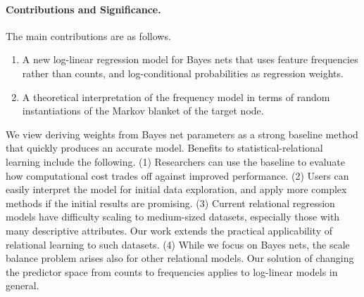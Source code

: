 \documentclass{article}
\begin{document}



\paragraph{Contributions and Significance.} The main contributions are as follows.
\begin{enumerate}
\item A new log-linear regression model for Bayes nets that uses feature frequencies rather than counts, and log-conditional probabilities as regression weights.
\item A theoretical interpretation of the frequency model in terms of random instantiations of the Markov blanket of the target node.
\end{enumerate}

We view deriving weights from Bayes net parameters as a strong baseline method that quickly produces an accurate model.  Benefits to statistical-relational learning include the following. (1) Researchers can use the baseline to evaluate how computational cost trades off against improved performance. (2) Users can easily interpret the model for initial data exploration, and apply more complex methods if the initial results are promising. (3) Current relational regression models have difficulty scaling to medium-sized datasets, especially those with many descriptive attributes. Our work extends the practical applicability of relational learning to such datasets. (4) While we focus on Bayes nets, the scale balance problem arises also for other relational models. Our solution of changing the predictor space from counts to frequencies applies to log-linear models in general.
\end{document}
